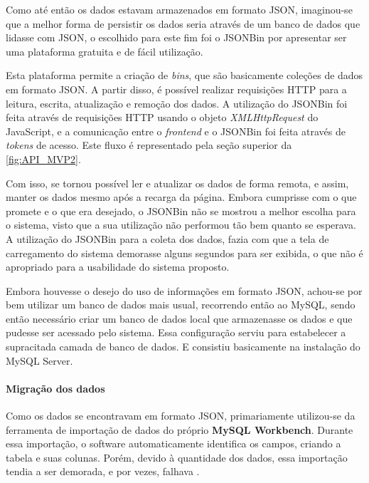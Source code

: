  \label{ssssec:JSONBin}

Como até então os dados estavam armazenados em formato JSON, imaginou-se que a melhor forma de persistir os dados seria através de um banco de dados que lidasse com JSON, o escolhido para este fim foi o JSONBin por apresentar ser uma plataforma gratuita e de fácil utilização.

Esta plataforma permite a criação de \textit{bins}, que são basicamente coleções de dados em formato JSON. A partir disso, é possível realizar requisições HTTP para a leitura, escrita, atualização e remoção dos dados. A utilização do JSONBin foi feita através de requisições HTTP usando o objeto \textit{XMLHttpRequest} do JavaScript, e a comunicação entre o \textit{frontend} e o JSONBin foi feita através de \textit{tokens} de acesso. Este fluxo é representado pela seção superior da \autoref{fig:API_MVP2}.

Com isso, se tornou possível ler e atualizar os dados de forma remota, e assim, manter os dados mesmo após a recarga da página. Embora cumprisse com o que promete e o que era desejado, o JSONBin não se mostrou a melhor escolha para o sistema, visto que a sua utilização não performou tão bem quanto se esperava.
A utilização do JSONBin para a coleta dos dados, fazia com que a tela de carregamento do sistema demorasse alguns segundos para ser exibida, o que não é apropriado para a usabilidade do sistema proposto.

 \label{ssssec:MySQL}

Embora houvesse o desejo do uso de informações em formato JSON, achou-se por bem utilizar um banco de dados mais usual, recorrendo então ao MySQL, sendo então necessário criar um banco de dados local que armazenasse os dados e que pudesse ser acessado pelo sistema. Essa configuração serviu para estabelecer a supracitada camada de banco de dados. E consistiu basicamente na instalação do MySQL Server.

\paragraph*{Migração dos dados}

Como os dados se encontravam em formato JSON, primariamente utilizou-se da ferramenta de importação de dados do próprio \textbf{MySQL Workbench}. Durante essa importação, o software automaticamente identifica os campos, criando a tabela e suas colunas. Porém, devido à quantidade dos dados, essa importação tendia a ser demorada, e por vezes, falhava
.

